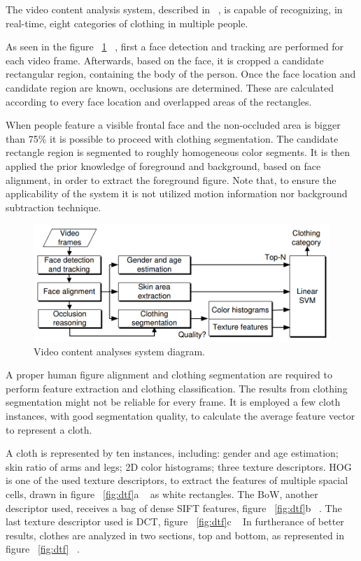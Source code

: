 \documentclass[titlepage,12pt,a4paper,times]{book}
\begin{document}
The video content analysis system, described in ~\citep{1}, is capable of
recognizing, in real-time, eight categories of clothing in multiple people.

As seen in the figure ~\ref{fig:vcasd} ~\citep{1}, first a face detection and
tracking are performed for each video frame. Afterwards, based on the face, it
is cropped a candidate rectangular region, containing the body of the person.
Once the face location and candidate region are known, occlusions are
determined. These are calculated according to every face location and
overlapped areas of the rectangles.

When people feature a visible frontal face and the non-occluded area is bigger
than 75\% it is possible to proceed with clothing segmentation. The candidate
rectangle region is segmented to roughly homogeneous color segments. It is then
applied the prior knowledge of foreground and background, based on face
alignment, in order to extract the foreground figure. Note that, to ensure the
applicability of the system it is not utilized motion information nor
background subtraction technique.

\begin{figure}[!h]
\centering
\includegraphics[scale=0.5]{images/Clothing_Diagram_1.png}
\caption{Video content analyses system diagram.}
\label{fig:vcasd}
\end{figure}
\FloatBarrier

A proper human figure alignment and clothing segmentation are required to
perform feature extraction and clothing classification. The results from
clothing segmentation might not be reliable for every frame. It is employed a
few cloth instances, with good segmentation quality, to calculate the average
feature vector to represent a cloth.

A cloth is represented by ten instances, including: gender and age estimation;
skin ratio of arms and legs; 2D color histograms; three texture descriptors.
\ac{HOG} is one of the used texture descriptors, to extract the features of
multiple spacial cells, drawn in figure ~\ref{fig:dtf}a ~\citep{1} as white
rectangles. The \ac{BoW}, another descriptor used, receives a bag of dense
\ac{SIFT} features, figure ~\ref{fig:dtf}b ~\citep{1}. The last texture
descriptor used is \ac{DCT}, figure ~\ref{fig:dtf}c ~\citep{1} In furtherance
of better results, clothes are analyzed in two sections, top and bottom, as
represented in figure ~\ref{fig:dtf} ~\citep{1}.
\end{document}
